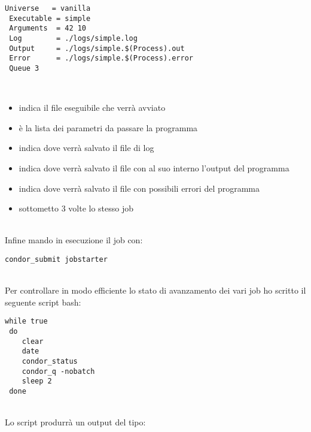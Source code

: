 \begin{lstlisting}[style=cmd]
 Universe   = vanilla
 Executable = simple
 Arguments  = 42 10
 Log        = ./logs/simple.log
 Output     = ./logs/simple.$(Process).out
 Error      = ./logs/simple.$(Process).error
 Queue 3
\end{lstlisting}
\ \\
\begin{itemize}
	\item {} indica il file eseguibile che verr\`{a} avviato
	\item {} \`{e} la lista dei parametri da passare la programma
	\item {} indica dove verr\`{a} salvato il file di log
	\item {} indica dove verr\`{a} salvato il file con al suo interno l'output del programma
	\item {} indica dove verr\`{a} salvato il file con possibili errori del programma
	\item {} sottometto 3 volte lo stesso job
\end{itemize}
\ \\
Infine mando in esecuzione il job con: 

\begin{lstlisting}[style=cmd]
 condor_submit jobstarter
\end{lstlisting}
\ \\
Per controllare in modo efficiente lo stato di avanzamento dei vari job ho scritto il seguente script bash:

\begin{lstlisting}[style=bash]
 while true
 do
    clear
    date
    condor_status
    condor_q -nobatch
    sleep 2
 done
\end{lstlisting}
\ \\
Lo script produrr\`{a} un output del tipo:


